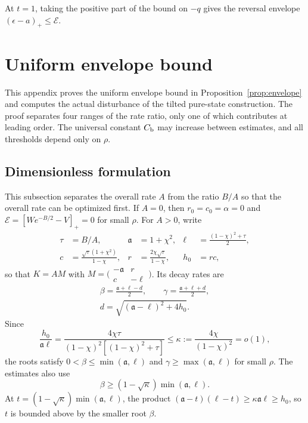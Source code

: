 \documentclass[aps,pra,reprint,amsmath,amssymb,nofootinbib,floatfix,longbibliography]{revtex4-2}
\theoremstyle{aps}
\newcommand{\eps}{\epsilon}
\begin{document}
At $t=1$, taking the positive part of the bound on $-q$ gives the reversal envelope $(\eps-a)_+\le\mathcal E$.

\section{Uniform envelope bound}\label{app:envelope}\label{sec:envelope}

This appendix proves the uniform envelope bound in Proposition~\ref{prop:envelope} and computes the actual disturbance of the tilted pure-state construction. The proof separates four ranges of the rate ratio, only one of which contributes at leading order. The universal constant $C_{\rm b}$ may increase between estimates, and all thresholds depend only on $\rho$.

\subsection{Dimensionless formulation}

This subsection separates the overall rate $A$ from the ratio $B/A$ so that the overall rate can be optimized first. If $A=0$, then $r_0=c_0=\alpha=0$ and
$\mathcal E=[We^{-B/2}-V]_+=0$ for small $\rho$. For $A>0$, write
\begin{align}
 \tau&=B/A,& \mathfrak a&=1+\chi^2,&
 \ell&=\frac{(1-\chi)^2+\tau}{2},\nonumber\\
 c&=\frac{\sqrt\tau(1+\chi^2)}{1-\chi},&
 r&=\frac{2\chi\sqrt\tau}{1-\chi},&
 h_0&=rc,\label{eq:dimensionless}
\end{align}
so that $K=AM$ with $M=\bigl(\begin{smallmatrix}-\mathfrak a&r\\c&-\ell\end{smallmatrix}\bigr)$. Its decay rates are
\begin{equation}\label{eq:rates}
 \begin{gathered}
 \beta=\frac{\mathfrak a+\ell-d}{2},\qquad
 \gamma=\frac{\mathfrak a+\ell+d}{2},\\
 d=\sqrt{(\mathfrak a-\ell)^2+4h_0}.
 \end{gathered}
\end{equation}
Since
\begin{equation}\label{eq:kappa}
 \frac{h_0}{\mathfrak a\ell}
 =\frac{4\chi\tau}{(1-\chi)^2[(1-\chi)^2+\tau]}
 \le\kappa:=\frac{4\chi}{(1-\chi)^2}=o(1),
\end{equation}
the roots satisfy $0<\beta\le\min(\mathfrak a,\ell)$ and $\gamma\ge\max(\mathfrak a,\ell)$ for small $\rho$. The estimates also use
\begin{equation}\label{eq:beta-lower}
 \beta\ge(1-\sqrt\kappa)\min(\mathfrak a,\ell).
\end{equation}
At $t=(1-\sqrt\kappa)\min(\mathfrak a,\ell)$, the product $(\mathfrak a-t)(\ell-t)\ge\kappa\mathfrak a\ell\ge h_0$, so $t$ is bounded above by the smaller root $\beta$.
\end{document}
